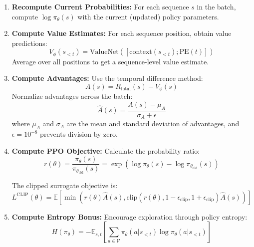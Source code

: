 \documentclass[conference]{IEEEtran}
\begin{document}
\begin{enumerate}
    \item \textbf{Recompute Current Probabilities:} For each sequence $s$ in the batch, compute $\log \pi_{\theta}(s)$ with the current (updated) policy parameters.
    
    \item \textbf{Compute Value Estimates:} For each sequence position, obtain value predictions:
    \begin{equation}
    V_\phi(s_{<t}) = \text{ValueNet}([\text{context}(s_{<t}); \text{PE}(t)])
    \end{equation}
    Average over all positions to get a sequence-level value estimate.
    
    \item \textbf{Compute Advantages:} Use the temporal difference method:
    \begin{equation}
    A(s) = R_{\text{total}}(s) - V_\phi(s)
    \end{equation}
    Normalize advantages across the batch:
    \begin{equation}
    \hat{A}(s) = \frac{A(s) - \mu_A}{\sigma_A + \epsilon}
    \end{equation}
    where $\mu_A$ and $\sigma_A$ are the mean and standard deviation of advantages, and $\epsilon = 10^{-8}$ prevents division by zero.
    
    \item \textbf{Compute PPO Objective:} Calculate the probability ratio:
    \begin{equation}
    r(\theta) = \frac{\pi_\theta(s)}{\pi_{\theta_{\text{old}}}(s)} = \exp(\log \pi_\theta(s) - \log \pi_{\theta_{\text{old}}}(s))
    \end{equation}
    
    The clipped surrogate objective is:
    \begin{equation}
    L^{\text{CLIP}}(\theta) = \mathbb{E}\left[\min\left(r(\theta)\hat{A}(s), \text{clip}(r(\theta), 1-\epsilon_{\text{clip}}, 1+\epsilon_{\text{clip}})\hat{A}(s)\right)\right]
    \end{equation}
    
    \item \textbf{Compute Entropy Bonus:} Encourage exploration through policy entropy:
    \begin{equation}
    H(\pi_\theta) = -\mathbb{E}_{s, t}\left[\sum_{a \in \mathcal{V}} \pi_\theta(a | s_{<t}) \log \pi_\theta(a | s_{<t})\right]
    \end{equation}
    

\end{enumerate}
\end{document}

